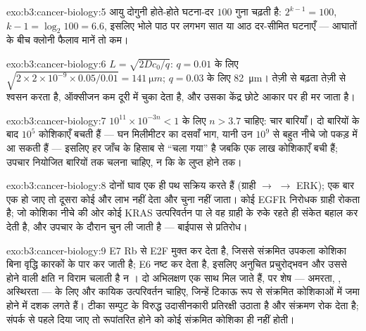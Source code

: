 \begin{solution}{exo:b3:cancer-biology:5}
आयु दोगुनी होते-होते घटना-दर $100$ गुना चढ़ती है: $2^{k-1} = 100$, $k - 1 =
\log_{2}100 = 6.6$, इसलिए भोले पाठ पर लगभग सात या आठ दर-सीमित घटनाएँ
--- आघातों के बीच क्लोनी फैलाव मानें तो कम।
\end{solution}

\begin{solution}{exo:b3:cancer-biology:6}
$L = \sqrt{2Dc_{0}/q}$: $q = 0.01$ के लिए $\sqrt{2\times 2\times 10^{-9}
\times 0.05/0.01} = \qty{141}{\micro m}$; $q = 0.03$ के लिए
\qty{82}{\micro m}। तेज़ी से बढ़ता  तेज़ी से श्वसन करता है, ऑक्सीजन
कम दूरी में चुका देता है, और उसका केंद्र छोटे आकार पर ही मर जाता है।
\end{solution}

\begin{solution}{exo:b3:cancer-biology:7}
$10^{11}\times 10^{-3n} < 1$ के लिए $n > 3.7$ चाहिए: चार बारियाँ। दो
बारियों के बाद $10^{5}$ कोशिकाएँ बचती हैं --- घन मिलीमीटर का दसवाँ
भाग, यानी उन $10^{9}$ से बहुत नीचे जो पकड़ में आ सकती हैं --- इसलिए हर
जाँच के हिसाब से  ``चला गया'' है जबकि एक लाख कोशिकाएँ बची हैं;
उपचार नियोजित बारियों तक चलना चाहिए, न कि  के लुप्त होने तक।
\end{solution}

\begin{solution}{exo:b3:cancer-biology:8}
दोनों घाव एक ही पथ सक्रिय करते हैं (ग्राही $\to$  $\to$ ERK);
एक बार एक हो जाए तो दूसरा कोई और लाभ नहीं देता और चुना नहीं जाता।
कोई EGFR निरोधक ग्राही रोकता है; जो कोशिका नीचे की ओर कोई
KRAS उत्परिवर्तन पा ले वह ग्राही के रुके रहते ही संकेत बहाल कर देती है,
और उपचार के दौरान चुन ली जाती है --- बाईपास से प्रतिरोध।
\end{solution}

\begin{solution}{exo:b3:cancer-biology:9}
E7 Rb से E2F मुक्त कर देता है, जिससे संक्रमित उपकला कोशिका बिना वृद्धि
कारकों के  पार कर जाती है; E6  नष्ट कर देता है, इसलिए
अनुचित प्रचुरोद्भवन और उससे होने वाली क्षति न विराम चलाती है न
। दो अभिलक्षण एक साथ मिल जाते हैं, पर शेष --- अमरता, ,
अस्थिरता --- के लिए और कायिक उत्परिवर्तन चाहिए, जिन्हें टिकाऊ रूप से
संक्रमित कोशिकाओं में जमा होने में दशक लगते हैं। टीका सम्पुट के
विरुद्ध उदासीनकारी प्रतिरक्षी उठाता है और संक्रमण रोक देता है; संपर्क
से पहले दिया जाए तो रूपांतरित होने को कोई संक्रमित कोशिका ही नहीं होती।
\end{solution}

